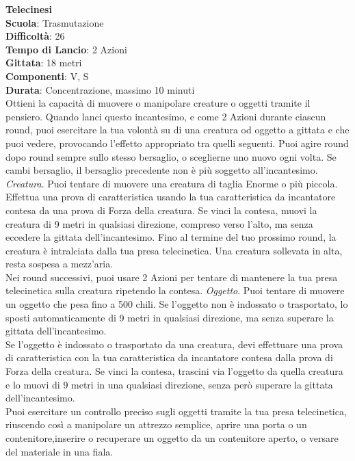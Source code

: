 \begin{multicols}{2}
\medskip\textbf{Telecinesi}\\
\textbf{Scuola}: Trasmutazione\\
\textbf{Difficoltà}: 26\\
\textbf{Tempo di Lancio}: 2 Azioni\\
\textbf{Gittata}: 18 metri\\
\textbf{Componenti}: V, S\\
\textbf{Durata}: Concentrazione, massimo 10 minuti \\
Ottieni la capacità di muovere o manipolare creature o oggetti tramite il pensiero. Quando lanci questo incantesimo, e come 2 Azioni durante ciascun round, puoi esercitare la tua volontà su di una creatura od oggetto a gittata e che puoi vedere, provocando l'effetto appropriato tra quelli seguenti. Puoi agire round dopo round sempre sullo stesso bersaglio, o sceglierne uno nuovo ogni volta. Se cambi bersaglio, il bersaglio precedente non è più soggetto all'incantesimo.
\textit{Creatura}. Puoi tentare di muovere una creatura di taglia Enorme o più piccola. Effettua una prova di caratteristica usando la tua caratteristica da incantatore contesa da una prova di Forza della creatura. Se vinci la contesa, muovi la creatura di 9 metri in qualsiasi direzione, compreso verso l'alto, ma senza eccedere la gittata dell'incantesimo. Fino al termine del tuo prossimo round, la creatura è intralciata dalla tua presa telecinetica. Una creatura sollevata in alta, resta sospesa a mezz'aria.\\
Nei round successivi, puoi usare 2 Azioni per tentare di mantenere la tua presa telecinetica sulla creatura ripetendo la contesa.
\textit{Oggetto}. Puoi tentare di muovere un oggetto che pesa fino a 500 chili. Se l'oggetto non è indossato o trasportato, lo sposti automaticamente di 9 metri in qualsiasi direzione, ma senza superare la gittata dell'incantesimo.\\
Se l'oggetto è indossato o trasportato da una creatura, devi effettuare una prova di caratteristica con la tua caratteristica da incantatore contesa dalla prova di Forza della creatura. Se vinci la contesa, trascini via l'oggetto da quella creatura e lo muovi di 9 metri in una qualsiasi direzione, senza però superare la gittata dell'incantesimo.\\
Puoi esercitare un controllo preciso sugli oggetti tramite la tua presa telecinetica, riuscendo così a manipolare un attrezzo semplice, aprire una porta o un contenitore,inserire o recuperare un oggetto da un contenitore aperto, o versare del materiale in una fiala.


\end{multicols}
